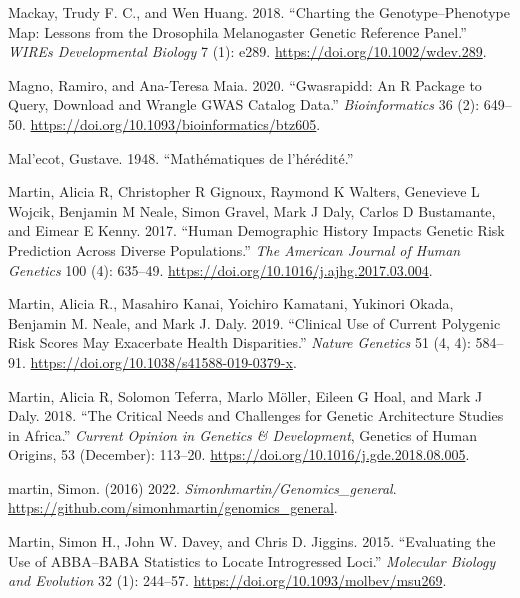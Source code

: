\documentclass[
]{book}
\newlength{\cslhangindent}
\newlength{\cslentryspacingunit} %
\newenvironment{CSLReferences}[2] %
 {%
  \setlength{\parindent}{0pt}
  \ifodd #1
  \let\oldpar\par
  \def\par{\hangindent=\cslhangindent\oldpar}
  \fi
  \setlength{\parskip}{#2\cslentryspacingunit}
 }%
 {}
\begin{document}
\begin{CSLReferences}{1}{0}
\leavevmode{}%
Mackay, Trudy F. C., and Wen Huang. 2018. {``Charting the Genotype--Phenotype Map: Lessons from the {Drosophila} Melanogaster {Genetic Reference Panel}.''} \emph{WIREs Developmental Biology} 7 (1): e289. \url{https://doi.org/10.1002/wdev.289}.

\leavevmode{}%
Magno, Ramiro, and Ana-Teresa Maia. 2020. {``Gwasrapidd: An {R} Package to Query, Download and Wrangle {GWAS} Catalog Data.''} \emph{Bioinformatics} 36 (2): 649--50. \url{https://doi.org/10.1093/bioinformatics/btz605}.

\leavevmode{}%
Mal'ecot, Gustave. 1948. {``Mathématiques de l'hérédité.''}

\leavevmode{}%
Martin, Alicia R, Christopher R Gignoux, Raymond K Walters, Genevieve L Wojcik, Benjamin M Neale, Simon Gravel, Mark J Daly, Carlos D Bustamante, and Eimear E Kenny. 2017. {``Human Demographic History Impacts Genetic Risk Prediction Across Diverse Populations.''} \emph{The American Journal of Human Genetics} 100 (4): 635--49. \url{https://doi.org/10.1016/j.ajhg.2017.03.004}.

\leavevmode{}%
Martin, Alicia R., Masahiro Kanai, Yoichiro Kamatani, Yukinori Okada, Benjamin M. Neale, and Mark J. Daly. 2019. {``Clinical Use of Current Polygenic Risk Scores May Exacerbate Health Disparities.''} \emph{Nature Genetics} 51 (4, 4): 584--91. \url{https://doi.org/10.1038/s41588-019-0379-x}.

\leavevmode{}%
Martin, Alicia R, Solomon Teferra, Marlo Möller, Eileen G Hoal, and Mark J Daly. 2018. {``The Critical Needs and Challenges for Genetic Architecture Studies in {Africa}.''} \emph{Current Opinion in Genetics \& Development}, Genetics of {Human Origins}, 53 (December): 113--20. \url{https://doi.org/10.1016/j.gde.2018.08.005}.

\leavevmode{}%
martin, Simon. (2016) 2022. \emph{Simonhmartin/Genomics\_general}. \url{https://github.com/simonhmartin/genomics_general}.

\leavevmode{}%
Martin, Simon H., John W. Davey, and Chris D. Jiggins. 2015. {``Evaluating the {Use} of {ABBA}--{BABA Statistics} to {Locate Introgressed Loci}.''} \emph{Molecular Biology and Evolution} 32 (1): 244--57. \url{https://doi.org/10.1093/molbev/msu269}.


\end{CSLReferences}
\end{document}
